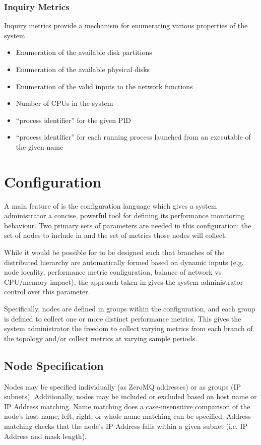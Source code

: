 \subsubsection{Inquiry Metrics}
Inquiry metrics provide a mechanism for enumerating various properties of the system.
\begin{itemize}
\item Enumeration of the available disk partitions
\item Enumeration of the available physical disks
\item Enumeration of the valid inputs to the network functions
\item Number of CPUs in the system
\item ``process identifier'' for the given PID
\item ``process identifier'' for each running process launched from an executable of the given name
\end{itemize}

\section{Configuration}
\label{configuration}

A main feature of \dcamp is the configuration language which gives a system administrator a concise, powerful tool for
defining its performance monitoring behaviour. Two primary sets of parameters are needed in this configuration: the set
of nodes to include in \dcamp and the set of metrics those nodes will collect.

While it would be possible for \dcamp to be designed such that branches of the distributed hierarchy are automatically
formed based on dynamic inputs (e.g. node locality, performance metric configuration, balance of network vs CPU/memory
impact), the approach taken in \dcamp gives the system administrator control over this parameter.

Specifically, nodes are defined in groups within the \dcamp configuration, and each group is defined to collect one or
more distinct performance metrics. This gives the system administrator the freedom to collect varying metrics from each
branch of the topology and/or collect metrics at varying sample periods.

\subsection{Node Specification}

Nodes may be specified individually (as ZeroMQ addresses) or as groups (IP subnets). Additionally, nodes may be included
or excluded based on host name or IP Address matching. Name matching does a case-insensitive comparison of the node's
host name; left, right, or whole name matching can be specified. Address matching checks that the node's IP Address
falls within a given subnet (i.e. IP Address and mask length).

